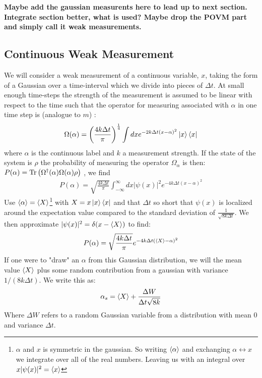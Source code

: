 \noindent
\textbf{Maybe add the gaussian measurents here to lead up to next section. Integrate section better, what is used? Maybe drop the POVM part and simply call it weak measurements.}

\subsection{Continuous Weak Measurement}
We will consider a weak measurement of a continuous variable, $x$, taking the form of a Gaussian over a time-interval which we divide into pieces of $\Delta t$. At small enough time-steps the strength of the measurement is assumed to be linear with respect to the time such that the operator for measuring associated with $\alpha$ in one time step is (analogue to $m$) :
\begin{equation}
    \Omega(\alpha) = \left(\frac{4 k \Delta t}{\pi}\right)^\frac14 \int dx e^{-2k\Delta t (x - \alpha)^2} \ket{x}\bra{x}
\end{equation}
where $\alpha$ is the continuous label and $k$ a measurement strength. If the state of the system is $\rho$ the probability of measuring the operator $\Omega_\alpha$ is then: $P(\alpha) = \Tr\left(\Omega^\dagger(\alpha) \Omega(\alpha) \rho \right)$ , we find 
\begin{align}
    P(\alpha) = \sqrt{\frac{4 k \Delta t}{\pi}} \int_{-\infty}^{\infty} dx |\psi(x)|^2 e^{-4k\Delta t (x - \alpha)^2}
\end{align}
Use $\expval{\alpha} = \expval{X}$\footnote{$\alpha$ and $x$ is symmetric in the gaussian. So writing $\expval{\alpha}$ and exchanging $\alpha \leftrightarrow x$ we integrate over all of the real numbers. Leaving us with an integral over $x|\psi(x)|^2 = \expval{x}$} with $X = x\ket{x}\bra{x}$ and that $\Delta{t}$ so short that $\psi(x)$ is localized around the expectation value compared to the standard deviation of $\frac{1}{\sqrt{8k\Delta t}}$. We then approximate $|\psi(x)|^2 = \delta(x - \expval{X})$ to find:
\begin{equation}
    P(\alpha) = \sqrt{\frac{4 k \Delta t}{\pi}}  e^{-4k\Delta t (\expval{X} - \alpha)^2}
\end{equation}
If one were to "draw" an $\alpha$ from this Gaussian distribution, we will the mean value $\expval{X}$ plus some random contribution from a gaussian with variance $1 / (8k\Delta t)$. We write this as:
\begin{equation}
    \alpha_s = \expval{X} + \frac{\Delta W}{\Delta t \sqrt{8k}}
\end{equation}
Where $\Delta W$ refers to a random Gaussian variable from a distribution with mean $0$ and variance $\Delta t$. 

